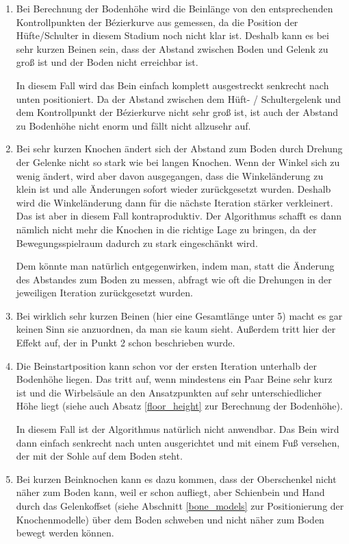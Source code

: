 \begin{enumerate}
 \item %
   Bei Berechnung der Bodenhöhe wird die Beinlänge von den entsprechenden Kontrollpunkten der Bézierkurve aus gemessen, da die Position der Hüfte/Schulter in diesem Stadium noch nicht klar ist. Deshalb kann es bei sehr kurzen Beinen sein, dass der Abstand zwischen Boden und Gelenk zu groß ist und der Boden nicht erreichbar ist.
   
   In diesem Fall wird das Bein einfach komplett ausgestreckt senkrecht nach unten positioniert. Da der Abstand zwischen dem Hüft- / Schultergelenk und dem Kontrollpunkt der Bézierkurve nicht sehr groß ist, ist auch der Abstand zu Bodenhöhe nicht enorm und fällt nicht allzusehr auf.
   
 \item %
   Bei sehr kurzen Knochen ändert sich der Abstand zum Boden durch Drehung der Gelenke nicht so stark wie bei langen Knochen. Wenn der Winkel sich zu wenig ändert, wird aber davon ausgegangen, dass die Winkeländerung zu klein ist und alle Änderungen sofort wieder zurückgesetzt wurden. Deshalb wird die Winkeländerung dann für die nächste Iteration stärker verkleinert. Das ist aber in diesem Fall kontraproduktiv. Der Algorithmus schafft es dann nämlich nicht mehr die Knochen in die richtige Lage zu bringen, da der Bewegungsspielraum dadurch zu stark eingeschänkt wird.
   
   Dem könnte man natürlich entgegenwirken, indem man, statt die Änderung des Abstandes zum Boden zu messen, abfragt wie oft die Drehungen in der jeweiligen Iteration zurückgesetzt wurden.
   
 \item %
   Bei wirklich sehr kurzen Beinen (hier eine Gesamtlänge unter 5) macht es gar keinen Sinn sie anzuordnen, da man sie kaum sieht. Außerdem tritt hier der Effekt auf, der in Punkt 2 schon beschrieben wurde.
   
 \item %
   Die Beinstartposition kann schon vor der ersten Iteration unterhalb der Bodenhöhe liegen. Das tritt auf, wenn mindestens ein Paar Beine sehr kurz ist und die Wirbelsäule an den Ansatzpunkten auf sehr unterschiedlicher Höhe liegt (siehe auch Absatz \ref{floor_height} zur Berechnung der Bodenhöhe).
   
   In diesem Fall ist der Algorithmus natürlich nicht anwendbar. Das Bein wird dann einfach senkrecht nach unten ausgerichtet und mit einem Fuß versehen, der mit der Sohle auf dem Boden steht.
   
 \item %
   Bei kurzen Beinknochen kann es dazu kommen, dass der Oberschenkel nicht näher zum Boden kann, weil er schon aufliegt, aber Schienbein und Hand durch das Gelenkoffset (siehe Abschnitt \ref{bone_models} zur Positionierung der Knochenmodelle) über dem Boden schweben und nicht näher zum Boden bewegt werden können.
\end{enumerate}







